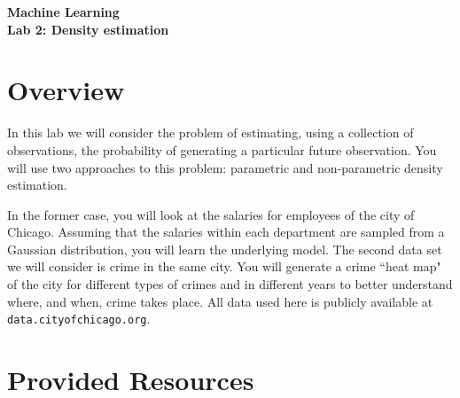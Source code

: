 \documentclass[11pt,noanswers,addpoints]{exam}
\begin{document}
{\Large{\textbf{Machine Learning}}} \\[2mm]
\textbf{\Huge{Lab 2: Density estimation}}\\[2mm]


\section{Overview}
In this lab we will consider the problem of estimating, using a collection of observations, 
the probability of generating a particular future observation. You will use two approaches to
this problem: parametric and non-parametric density estimation.

In the former case, you will look at the salaries for employees of the city of Chicago. Assuming
that the salaries within each department are sampled from a Gaussian distribution, you will learn the
underlying model. The second data set we will consider is crime in the same city. You will generate a crime 
``heat map" of the city for different types of crimes and in different years to better understand where, and when,
crime takes place. All data used here is publicly available at \texttt{data.cityofchicago.org}.

\section{Provided Resources}
\end{document}
